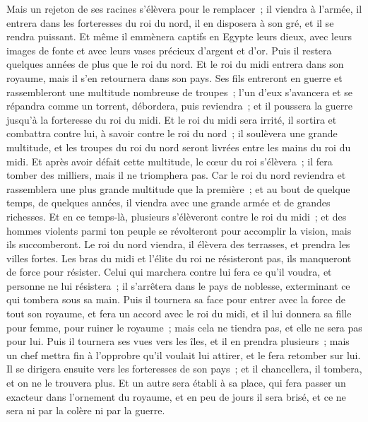 \begin{multicols}{2}
Mais un rejeton de ses racines s'élèvera pour le remplacer~; il viendra à l'armée, il entrera dans les forteresses du roi du nord, il en disposera à son gré, et il se rendra puissant.
Et même il emmènera captifs en Egypte leurs dieux, avec leurs images de fonte et avec leurs vases précieux d'argent et d'or. Puis il restera quelques années de plus que le roi du nord.
Et le roi du midi entrera dans son royaume, mais il s'en retournera dans son pays.
Ses fils entreront en guerre et rassembleront une multitude nombreuse de troupes~; l'un d'eux s'avancera et se répandra comme un torrent, débordera, puis reviendra~; et il poussera la guerre jusqu'à la forteresse du roi du midi.
Et le roi du midi sera irrité, il sortira et combattra contre lui, à savoir contre le roi du nord~; il soulèvera une grande multitude, et les troupes du roi du nord seront livrées entre les mains du roi du midi.
Et après avoir défait cette multitude, le cœur du roi s'élèvera~; il fera tomber des milliers, mais il ne triomphera pas.
Car le roi du nord reviendra et rassemblera une plus grande multitude que la première~; et au bout de quelque temps, de quelques années, il viendra avec une grande armée et de grandes richesses.
Et en ce temps-là, plusieurs s'élèveront contre le roi du midi~; et des hommes violents parmi ton peuple se révolteront pour accomplir la vision, mais ils succomberont.
Le roi du nord viendra, il élèvera des terrasses, et prendra les villes fortes. Les bras du midi et l'élite du roi ne résisteront pas, ils manqueront de force pour résister.
Celui qui marchera contre lui fera ce qu'il voudra, et personne ne lui résistera~; il s'arrêtera dans le pays de noblesse, exterminant ce qui tombera sous sa main.
Puis il tournera sa face pour entrer avec la force de tout son royaume, et fera un accord avec le roi du midi, et il lui donnera sa fille pour femme, pour ruiner le royaume~; mais cela ne tiendra pas, et elle ne sera pas pour lui. 
Puis il tournera ses vues vers les îles, et il en prendra plusieurs~; mais un chef mettra fin à l'opprobre qu'il voulait lui attirer, et le fera retomber sur lui.
Il se dirigera ensuite vers les forteresses de son pays~; et il chancellera, il tombera, et on ne le trouvera plus.
Et un autre sera établi à sa place, qui fera passer un exacteur dans l'ornement du royaume, et en peu de jours il sera brisé, et ce ne sera ni par la colère ni par la guerre.

\end{multicols}
